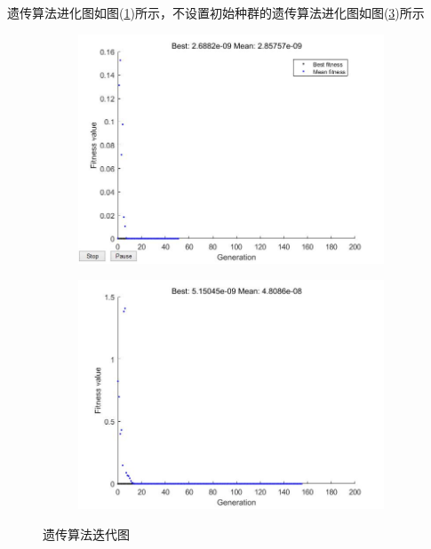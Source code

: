             \par
            遗传算法进化图如图(\ref{fig:太阳影子遗传算法迭代图})所示，不设置初始种群的遗传算法进化图如图(\ref{fig:不设置初始种群的遗传算法进化图})所示
                \begin{figure}[H]
                    \centering
                    \begin{subfigure}[b]{0.4\textwidth}
                        \includegraphics[width=\textwidth]{images/GA_taiyangyingzi_1.jpg}
                        \caption{}
                        \label{fig:太阳影子遗传算法迭代图}
                    \end{subfigure}
                    \begin{subfigure}[b]{0.4\textwidth}
                        \includegraphics[width=\textwidth]{images/GA_taiyangyingzi_2.jpg}
                        \caption{}
                        \label{fig:不设置初始种群的遗传算法进化图}
                    \end{subfigure}
                    \caption{遗传算法迭代图}
                \end{figure}


